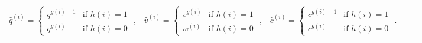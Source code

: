 \begin{table}[h]
    \small
    \vspace{-3mm}
    \hspace*{12mm}
    \begin{tabular}{lclcl}
    $
    \hat{q}^{(i)} = 
    \begin{cases} 
    q^{g(i)+1} & \text{if }h(i)=1 \\
    q^{g(i)} & \text{if }h(i)=0
    \end{cases} 
    $ ,
    &
    $
    \hat{v}^{(i)} = 
    \begin{cases} 
    v^{g(i)} & \text{if }h(i)=1 \\
    w^{(i)} & \text{if }h(i)=0
    \end{cases} 
    $ ,
    &
    $
    \hat{c}^{(i)} = 
    \begin{cases} 
    c^{g(i)+1} & \text{if }h(i)=1 \\
    c^{g(i)} & \text{if }h(i)=0
    \end{cases} 
    $ .
    \end{tabular}
    \vspace{-3mm}
\end{table}

